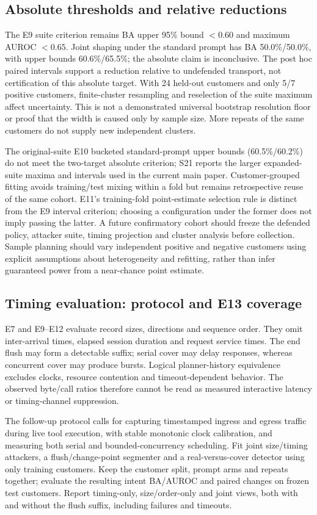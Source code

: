 \subsection{Absolute thresholds and relative reductions}
The E9 suite criterion remains BA upper 95\% bound $<0.60$ and maximum AUROC $<0.65$. Joint shaping under the standard prompt has BA 50.0\%/50.0\%, with upper bounds 60.6\%/65.5\%; the absolute claim is inconclusive. The post hoc paired intervals support a reduction relative to undefended transport, not certification of this absolute target. With 24 held-out customers and only 5/7 positive customers, finite-cluster resampling and reselection of the suite maximum affect uncertainty. This is not a demonstrated universal bootstrap resolution floor or proof that the width is caused only by sample size. More repeats of the same customers do not supply new independent clusters.

The original-suite E10 bucketed standard-prompt upper bounds (60.5\%/60.2\%) do not meet the two-target absolute criterion; S21 reports the larger expanded-suite maxima and intervals used in the current main paper. Customer-grouped fitting avoids training/test mixing within a fold but remains retrospective reuse of the same cohort. E11's training-fold point-estimate selection rule is distinct from the E9 interval criterion; choosing a configuration under the former does not imply passing the latter. A future confirmatory cohort should freeze the defended policy, attacker suite, timing projection and cluster analysis before collection. Sample planning should vary independent positive and negative customers using explicit assumptions about heterogeneity and refitting, rather than infer guaranteed power from a near-chance point estimate.

\subsection{Timing evaluation: protocol and E13 coverage}
E7 and E9--E12 evaluate record sizes, directions and sequence order. They omit inter-arrival times, elapsed session duration and request service times. The end flush may form a detectable suffix; serial cover may delay responses, whereas concurrent cover may produce bursts. Logical planner-history equivalence excludes clocks, resource contention and timeout-dependent behavior. The observed byte/call ratios therefore cannot be read as measured interactive latency or timing-channel suppression.

The follow-up protocol calls for capturing timestamped ingress and egress traffic during live tool execution, with stable monotonic clock calibration, and measuring both serial and bounded-concurrency scheduling. Fit joint size/timing attackers, a flush/change-point segmenter and a real-versus-cover detector using only training customers. Keep the customer split, prompt arms and repeats together; evaluate the resulting intent BA/AUROC and paired changes on frozen test customers. Report timing-only, size/order-only and joint views, both with and without the flush suffix, including failures and timeouts.

